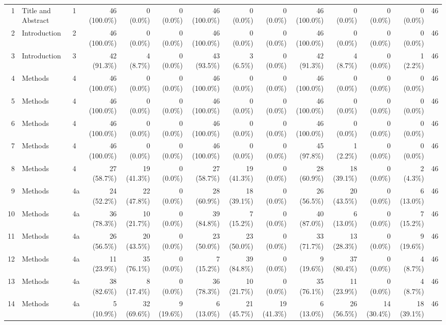 \begin{longtable}{@{}rll*{11}{r}@{}}
1 & Title and Abstract & 1 & 46 (100.0\%) & 0 (0.0\%) & 0 (0.0\%) & 46 (100.0\%) & 0 (0.0\%) & 0 (0.0\%) & 46 (100.0\%) & 0 (0.0\%) & 0 (0.0\%) & 0 (0.0\%) & 46 \\
2 & Introduction & 2 & 46 (100.0\%) & 0 (0.0\%) & 0 (0.0\%) & 46 (100.0\%) & 0 (0.0\%) & 0 (0.0\%) & 46 (100.0\%) & 0 (0.0\%) & 0 (0.0\%) & 0 (0.0\%) & 46 \\
3 & Introduction & 3 & 42 (91.3\%) & 4 (8.7\%) & 0 (0.0\%) & 43 (93.5\%) & 3 (6.5\%) & 0 (0.0\%) & 42 (91.3\%) & 4 (8.7\%) & 0 (0.0\%) & 1 (2.2\%) & 46 \\
4 & Methods & 4 & 46 (100.0\%) & 0 (0.0\%) & 0 (0.0\%) & 46 (100.0\%) & 0 (0.0\%) & 0 (0.0\%) & 46 (100.0\%) & 0 (0.0\%) & 0 (0.0\%) & 0 (0.0\%) & 46 \\
5 & Methods & 4 & 46 (100.0\%) & 0 (0.0\%) & 0 (0.0\%) & 46 (100.0\%) & 0 (0.0\%) & 0 (0.0\%) & 46 (100.0\%) & 0 (0.0\%) & 0 (0.0\%) & 0 (0.0\%) & 46 \\
6 & Methods & 4 & 46 (100.0\%) & 0 (0.0\%) & 0 (0.0\%) & 46 (100.0\%) & 0 (0.0\%) & 0 (0.0\%) & 46 (100.0\%) & 0 (0.0\%) & 0 (0.0\%) & 0 (0.0\%) & 46 \\
7 & Methods & 4 & 46 (100.0\%) & 0 (0.0\%) & 0 (0.0\%) & 46 (100.0\%) & 0 (0.0\%) & 0 (0.0\%) & 45 (97.8\%) & 1 (2.2\%) & 0 (0.0\%) & 0 (0.0\%) & 46 \\
8 & Methods & 4 & 27 (58.7\%) & 19 (41.3\%) & 0 (0.0\%) & 27 (58.7\%) & 19 (41.3\%) & 0 (0.0\%) & 28 (60.9\%) & 18 (39.1\%) & 0 (0.0\%) & 2 (4.3\%) & 46 \\
9 & Methods & 4a & 24 (52.2\%) & 22 (47.8\%) & 0 (0.0\%) & 28 (60.9\%) & 18 (39.1\%) & 0 (0.0\%) & 26 (56.5\%) & 20 (43.5\%) & 0 (0.0\%) & 6 (13.0\%) & 46 \\
10 & Methods & 4a & 36 (78.3\%) & 10 (21.7\%) & 0 (0.0\%) & 39 (84.8\%) & 7 (15.2\%) & 0 (0.0\%) & 40 (87.0\%) & 6 (13.0\%) & 0 (0.0\%) & 7 (15.2\%) & 46 \\
11 & Methods & 4a & 26 (56.5\%) & 20 (43.5\%) & 0 (0.0\%) & 23 (50.0\%) & 23 (50.0\%) & 0 (0.0\%) & 33 (71.7\%) & 13 (28.3\%) & 0 (0.0\%) & 9 (19.6\%) & 46 \\
12 & Methods & 4a & 11 (23.9\%) & 35 (76.1\%) & 0 (0.0\%) & 7 (15.2\%) & 39 (84.8\%) & 0 (0.0\%) & 9 (19.6\%) & 37 (80.4\%) & 0 (0.0\%) & 4 (8.7\%) & 46 \\
13 & Methods & 4a & 38 (82.6\%) & 8 (17.4\%) & 0 (0.0\%) & 36 (78.3\%) & 10 (21.7\%) & 0 (0.0\%) & 35 (76.1\%) & 11 (23.9\%) & 0 (0.0\%) & 4 (8.7\%) & 46 \\
14 & Methods & 4a & 5 (10.9\%) & 32 (69.6\%) & 9 (19.6\%) & 6 (13.0\%) & 21 (45.7\%) & 19 (41.3\%) & 6 (13.0\%) & 26 (56.5\%) & 14 (30.4\%) & 18 (39.1\%) & 46 \\

\end{longtable}
